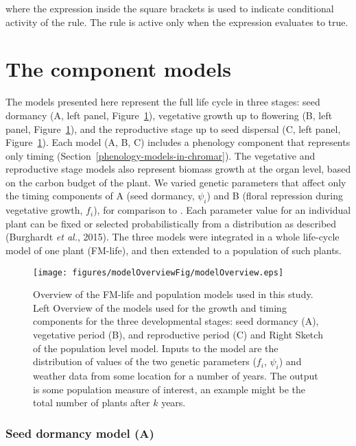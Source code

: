 \documentclass[phd]{infthesis}
\begin{document}
where the expression inside the square brackets is used to indicate
conditional activity of the rule. The rule is active only when the
expression evaluates to true.

\section{The component models}
\label{sec:compModels}
The models presented here represent the full life cycle in three stages:
seed dormancy (A, left panel, Figure~\ref{fig:overview}), vegetative growth up to
flowering (B, left panel, Figure~\ref{fig:overview}), and the reproductive stage up to
seed dispersal (C, left panel, Figure~\ref{fig:overview}). Each model (A, B, C) includes
a phenology component that represents only timing
(Section~\ref{phenology-models-in-chromar}). The
vegetative and reproductive stage models also represent biomass growth
at the organ level, based on the carbon budget of the plant. We varied
genetic parameters that affect only the timing components of A (seed
dormancy, \(\psi_{i}\)) and B (floral repression during vegetative
growth, \(f_{i}\)), for comparison to \citet{burghardt_modeling_2015}.
Each parameter value for an individual plant can be fixed or selected
probabilistically from a distribution as described (Burghardt \emph{et
al.}, 2015). The three models were integrated in a whole life-cycle
model of one plant (FM-life), and then extended to a population of such
plants.

\begin{figure}[tb]
  \centering
\texttt{[image: figures/modelOverviewFig/modelOverview.eps]}
\caption{Overview of the FM-life and population models used in this
study. Left Overview of the models used for the growth and timing
components for the three developmental stages: seed dormancy (A),
vegetative period (B), and reproductive period (C) and Right Sketch of
the population level model. Inputs to the model are the distribution of
values of the two genetic parameters (\(f_{i}\), \(\psi_{i}\)) and
weather data from some location for a number of years. The output is
some population measure of interest, an example might be the total
number of plants after \(k\) years.}
\label{fig:overview}
\end{figure}

\subsubsection{Seed dormancy model (A)}
\label{seed-dormancy-model-a}
\end{document}
